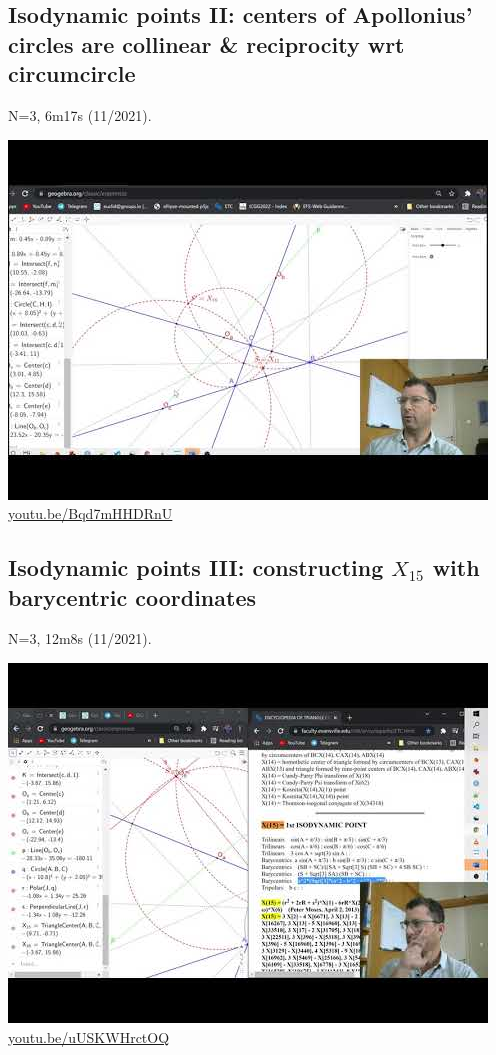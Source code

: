 \documentclass[12pt]{amsart}
\begin{document}
\subsection{Isodynamic points II: centers of Apollonius' circles are collinear \& reciprocity wrt circumcircle}
\label{vid:Bqd7mHHDRnU}
\noindent N=3, 6m17s (11/2021). 
\begin{center}\includegraphics[width=.5\textwidth]{pics/Bqd7mHHDRnU.jpg} \\ 
\href{https://youtu.be/Bqd7mHHDRnU}{\url{youtu.be/Bqd7mHHDRnU}}\end{center}
% 
\subsection{Isodynamic points III: constructing $X_{15}$ with barycentric coordinates}
\label{vid:uUSKWHrctOQ}
\noindent N=3, 12m8s (11/2021). 
\begin{center}\includegraphics[width=.5\textwidth]{pics/uUSKWHrctOQ.jpg} \\ 
\href{https://youtu.be/uUSKWHrctOQ}{\url{youtu.be/uUSKWHrctOQ}}\end{center}
% 
\end{document}
